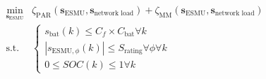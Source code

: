 \begin{equation}
\begin{split}
	\min_{\textbf{s}_\text{ESMU}} & \zeta_\text{PAR}(\textbf{s}_\text{ESMU}, \textbf{s}_\text{network load}) + \zeta_\text{MM}(\textbf{s}_\text{ESMU}, \textbf{s}_\text{network load})\\
	\text{s.t. }& \begin{cases}
		s_\text{bat}(k) \leq C_f\times C_\text{bat} \forall k\\
		\left|s_{\text{ESMU},\phi}(k)\right| \leq S_\text{rating} \forall \phi \forall k\\
		0 \leq SOC(k) \leq 1 \forall k
	\end{cases}
\end{split}
\label{ch1:equ:scheduling-cost}
\end{equation}